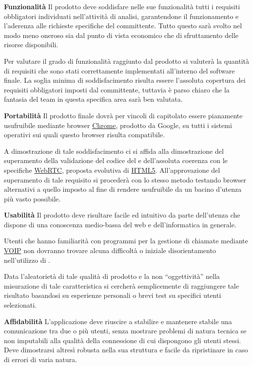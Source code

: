 \begin{description}
\item{\bfseries Funzionalità}
Il prodotto \caName{} deve soddisfare nelle sue funzionalità tutti i requisiti obbligatori individuati nell'attività di analisi, garantendone il funzionamento e l'aderenza alle richieste specifiche del committente. Tutto questo sarà svolto nel modo meno oneroso sia dal punto di vista economico che di sfruttamento delle risorse disponibili.

Per valutare il grado di funzionalità raggiunto dal prodotto si valuterà la quantità di requisiti che sono stati correttamente implementati all'interno del software finale. La soglia minima di soddisfacimento risulta essere l'assoluta copertura dei requisiti obbligatori imposti dal committente, tuttavia è parso chiaro che la fantasia del team in questa specifica area sarà ben valutata.

\item{\bfseries Portabilità}
Il prodotto finale dovrà per vincoli di capitolato essere pianamente usufruibile mediante browser \underline{Chrome}, prodotto da Google, su tutti i sistemi operativi sui quali questo browser risulta compatibile.

A dimostrazione di tale soddisfacimento ci si affida alla dimostrazione del superamento della validazione del codice del  e dell'assoluta coerenza con le specifiche \underline{WebRTC}, proposta evolutiva di \underline{HTML5}.
All'approvazione del superamento di tale requisito si procederà con lo stesso metodo testando browser alternativi a quello imposto al fine di rendere \caName{} usufruibile da un bacino d'utenza più vasto possibile.

\item{\bfseries Usabilità}
Il prodotto deve risultare facile ed intuitivo da parte dell'utenza che dispone di una conoscenza medio-bassa del web e dell'informatica in generale.

Utenti che hanno familiarità con programmi per la gestione di chiamate mediante \underline{VOIP} non dovranno trovare alcuna difficoltà o iniziale disorientamento nell'utilizzo di \caName{}.

Data l'aleatorietà di tale qualità di prodotto e la non ``oggettività'' nella misurazione di tale caratteristica si cercherà semplicemente di raggiungere tale risultato basandosi su esperienze personali o brevi test su specifici utenti selezionati.

\item{\bfseries Affidabilità}
L'applicazione deve riuscire a stabilire e mantenere stabile una comunicazione tra due o più utenti, senza mostrare problemi di natura tecnica se non imputabili alla qualità della connessione di cui dispongono gli utenti stessi. Deve dimostrarsi altresì robusta nella sua struttura e facile da ripristinare in caso di errori di varia natura.


\end{description}
